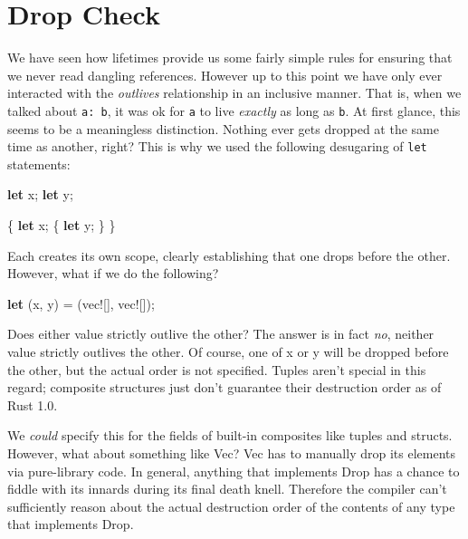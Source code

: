 \documentclass[a4paper,]{book}
\newenvironment{Shaded}{\begin{snugshade}}{\end{snugshade}}
\newcommand{\KeywordTok}[1]{\textcolor[rgb]{0.13,0.29,0.53}{\textbf{{#1}}}}
\newcommand{\OtherTok}[1]{\textcolor[rgb]{0.56,0.35,0.01}{{#1}}}
\newcommand{\NormalTok}[1]{{#1}}
\begin{document}
\section{Drop Check}\label{sec--dropck}

We have seen how lifetimes provide us some fairly simple rules for
ensuring that we never read dangling references. However up to this
point we have only ever interacted with the \emph{outlives} relationship
in an inclusive manner. That is, when we talked about
\texttt{\textquotesingle{}a:\ \textquotesingle{}b}, it was ok for
\texttt{\textquotesingle{}a} to live \emph{exactly} as long as
\texttt{\textquotesingle{}b}. At first glance, this seems to be a
meaningless distinction. Nothing ever gets dropped at the same time as
another, right? This is why we used the following desugaring of
\texttt{let} statements:

\begin{Shaded}
\begin{Highlighting}[]
\KeywordTok{let} \NormalTok{x;}
\KeywordTok{let} \NormalTok{y;}
\end{Highlighting}
\end{Shaded}

\begin{Shaded}
\begin{Highlighting}[]
\NormalTok{\{}
    \KeywordTok{let} \NormalTok{x;}
    \NormalTok{\{}
        \KeywordTok{let} \NormalTok{y;}
    \NormalTok{\}}
\NormalTok{\}}
\end{Highlighting}
\end{Shaded}

Each creates its own scope, clearly establishing that one drops before
the other. However, what if we do the following?

\begin{Shaded}
\begin{Highlighting}[]
\KeywordTok{let} \NormalTok{(x, y) = (}\OtherTok{vec!}\NormalTok{[], }\OtherTok{vec!}\NormalTok{[]);}
\end{Highlighting}
\end{Shaded}

Does either value strictly outlive the other? The answer is in fact
\emph{no}, neither value strictly outlives the other. Of course, one of
x or y will be dropped before the other, but the actual order is not
specified. Tuples aren't special in this regard; composite structures
just don't guarantee their destruction order as of Rust 1.0.

We \emph{could} specify this for the fields of built-in composites like
tuples and structs. However, what about something like Vec? Vec has to
manually drop its elements via pure-library code. In general, anything
that implements Drop has a chance to fiddle with its innards during its
final death knell. Therefore the compiler can't sufficiently reason
about the actual destruction order of the contents of any type that
implements Drop.
\end{document}

